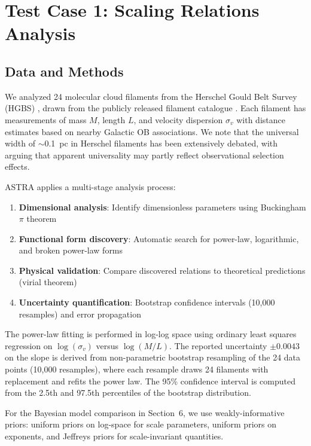 \documentclass[usenatbib]{rasti}
\begin{document}
\section{Test Case 1: Scaling Relations Analysis}

\subsection{Data and Methods}

We analyzed 24 molecular cloud filaments from the Herschel Gould Belt Survey (HGBS) \cite{andre2010}, drawn from the publicly released filament catalogue \cite{arzoumanian2019}. Each filament has measurements of mass $M$, length $L$, and velocity dispersion $\sigma_v$ with distance estimates based on nearby Galactic OB associations. We note that the universal width of $\sim$0.1~pc in Herschel filaments has been extensively debated, with \cite{panopoulou2022} arguing that apparent universality may partly reflect observational selection effects.

ASTRA applies a multi-stage analysis process:
\begin{enumerate}
\item \textbf{Dimensional analysis}: Identify dimensionless parameters using Buckingham $\pi$ theorem
\item \textbf{Functional form discovery}: Automatic search for power-law, logarithmic, and broken power-law forms
\item \textbf{Physical validation}: Compare discovered relations to theoretical predictions (virial theorem)
\item \textbf{Uncertainty quantification}: Bootstrap confidence intervals (10,000 resamples) and error propagation
\end{enumerate}

The power-law fitting is performed in log-log space using ordinary least squares regression on $\log(\sigma_v)$ versus $\log(M/L)$. The reported uncertainty $\pm 0.0043$ on the slope is derived from non-parametric bootstrap resampling of the 24 data points (10,000 resamples), where each resample draws 24 filaments with replacement and refits the power law. The 95\% confidence interval is computed from the 2.5th and 97.5th percentiles of the bootstrap distribution.

For the Bayesian model comparison in Section~6, we use weakly-informative priors: uniform priors on log-space for scale parameters, uniform priors on exponents, and Jeffreys priors for scale-invariant quantities.
\end{document}
